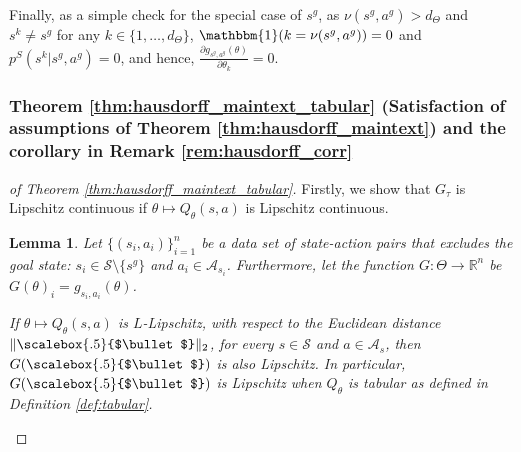 \documentclass{amsart}
\newtheorem{lemma}{Lemma}
\renewcommand{\cdot}[1][.5]{%
  \mathbin{\vcenter{\hbox{\scalebox{#1}{$\bullet$}}}}%
}
\begin{document}
Finally, as a simple check for the special case of $s^g$, as $\nu(s^g,a^g) > d_{\Theta}$ and $s^k \neq s^g$ for any $k \in \{1,\dots,d_\Theta\}$, $\mathbbm{1}(k=\nu(s^g,a^g))=0$ and $p^S(s^k|s^g,a^g)=0$, and hence, $\frac{\partial g_{s^g,a^g}(\theta)}{\partial \theta_k}=0$.


\subsubsection{Theorem \ref{thm:hausdorff_maintext_tabular} (Satisfaction of assumptions of Theorem \ref{thm:hausdorff_maintext}) and the corollary in Remark \ref{rem:hausdorff_corr}} \label{apd:hausdorff_assumptions_proof}

\begin{proof}[of Theorem \ref{thm:hausdorff_maintext_tabular}]
Firstly, we show that $G_\tau$ is Lipschitz continuous if $\theta \mapsto Q_\theta(s,a)$ is Lipschitz continuous.

\begin{lemma}\label{lem:lipschitz} 
Let $\{(s_i,a_i)\}_{i=1}^n$ be a data set of state-action pairs that excludes the goal state: $s_i \in \mathcal{S} \setminus \{s^g\}$ and $a_i \in \mathcal{A}_{s_i}$. Furthermore, let the function $G:\Theta \rightarrow \mathbb{R}^n$ be $G(\theta)_i=g_{s_i,a_i}(\theta)$.

If $\theta \mapsto Q_\theta(s,a)$ is $L$-Lipschitz, with respect to the Euclidean distance $\lVert\cdot\rVert_2$, for every $s \in \mathcal{S}$ and $a \in \mathcal{A}_s$, then $G(\cdot)$ is also Lipschitz.  In particular, $G(\cdot)$ is Lipschitz when $Q_\theta$ is tabular as defined in Definition \ref{def:tabular}.
\end{lemma}


\end{proof}
\end{document}
